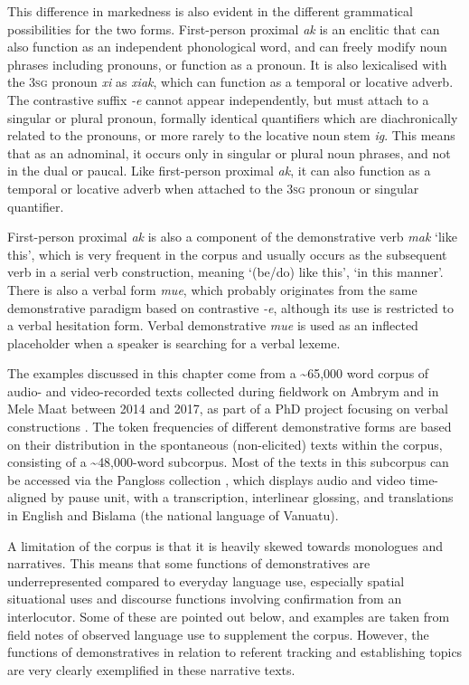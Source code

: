 \documentclass[output=paper,colorlinks,citecolor=brown]{langscibook}
\begin{document}
This difference in markedness is also evident in the different grammatical possibilities for the two forms. First-person proximal \textit{ak} is an enclitic that can also function as an independent phonological word, and can freely modify noun phrases including pronouns, or function as a pronoun. It is also lexicalised with the \textsc{3sg} pronoun \textit{xi} as \textit{xiak}, which can function as a temporal or locative adverb. The contrastive suffix \textit{-e} cannot appear independently, but must attach to a singular or plural pronoun, formally identical quantifiers which are diachronically related to the pronouns, or more rarely to the locative noun stem \textit{ig}. This means that as an adnominal, it occurs only in singular or plural noun phrases, and not in the dual or paucal. Like first-person proximal \textit{ak}, it can also function as a temporal or locative adverb when attached to the \textsc{3sg} pronoun or singular quantifier.

First-person proximal \textit{ak} is also a component of the demonstrative verb \textit{mak} ‘like this’, which is very frequent in the corpus and usually occurs as the subsequent verb in a serial verb construction, meaning ‘(be/do) like this’, ‘in this manner’. There is also a verbal form \textit{mue}, which probably originates from the same demonstrative paradigm based on contrastive \textit{-e}, although its use is restricted to a verbal hesitation form. Verbal demonstrative \textit{mue} is used as an inflected placeholder when a speaker is searching for a verbal lexeme.

The examples discussed in this chapter come from a {\textasciitilde}65,000 word corpus of audio- and video-recorded texts collected during fieldwork on Ambrym and in Mele Maat between 2014 and 2017, as part of a PhD project focusing on verbal constructions \citep{Ridge2019}. The token frequencies of different demonstrative forms are based on their distribution in the spontaneous (non-elicited) texts within the corpus, consisting of a {\textasciitilde}48,000-word subcorpus. Most of the texts in this subcorpus can be accessed via the Pangloss collection \citep{Ridge2018Deposit}, which displays audio and video time-aligned by pause unit, with a transcription, interlinear glossing, and translations in English and Bislama (the national language of Vanuatu).

A limitation of the corpus is that it is heavily skewed towards monologues and narratives. This means that some functions of demonstratives are underrepresented compared to everyday language use, especially spatial situational uses and discourse functions involving confirmation from an interlocutor. Some of these are pointed out below, and examples are taken from field notes of observed language use to supplement the corpus. However, the functions of demonstratives in relation to referent tracking and establishing topics are very clearly exemplified in these narrative texts.
\end{document}
